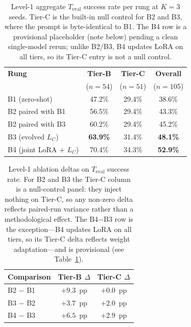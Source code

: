 \begin{table}[t]
\small
\centering
\begin{tabular}{lccc}
\hline
\textbf{Rung} & \textbf{Tier-B} & \textbf{Tier-C} & \textbf{Overall} \\
              & ($n{=}54$) & ($n{=}51$) & ($n{=}105$) \\
\hline
B1 (zero-shot)              & 47.2\%  & 29.4\%  & 38.6\%  \\
B2 paired with B1           & 56.5\%  & 29.4\%  & 43.3\%  \\
B2 paired with B3           & 60.2\%  & 29.4\%  & 45.2\%  \\
B3 (evolved $L_C$)          & \textbf{63.9\%}  & 31.4\%  & \textbf{48.1\%}  \\
B4 (joint LoRA + $L_C$)     & 70.4\%  & 34.3\%  & \textbf{52.9\%}  \\ %
\hline
\end{tabular}
\caption{Level-1 aggregate $T_{\text{eval}}$ success rate per rung at $K{=}3$
seeds. Tier-C is the built-in null control for B2 and B3, where the prompt is
byte-identical to B1. The B4 row is a provisional placeholder (note below)
pending a clean single-model rerun; unlike B2/B3, B4 updates LoRA on all tiers,
so its Tier-C entry is not a null control.}
\label{tab:aw-main}
\end{table}


\begin{table}[t]
\small
\centering
\begin{tabular}{lcc}
\hline
\textbf{Comparison} & \textbf{Tier-B $\Delta$} & \textbf{Tier-C $\Delta$} \\
\hline
B2 $-$ B1   & $+9.3$~pp & $+0.0$~pp \\
B3 $-$ B2   & $+3.7$~pp & $+2.0$~pp \\
B4 $-$ B3   & $+6.5$~pp & $+2.9$~pp \\ %
\hline
\end{tabular}
\caption{Level-1 ablation deltas on $T_{\text{eval}}$ success rate. For B2 and
B3 the Tier-C column is a null-control panel: they inject nothing on Tier-C, so
any non-zero delta reflects paired-run variance rather than a methodological
effect. The B4$-$B3 row is the exception---B4 updates LoRA on all tiers, so its
Tier-C delta reflects weight adaptation---and is provisional (see
Table~\ref{tab:aw-main}).}
\label{tab:aw-deltas}
\end{table}

